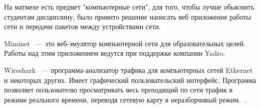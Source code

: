 
На матмехе есть предмет "компьютерные сети", для того, чтобы лучше обьяснить студентам дисциплину, 
было приянто решение написать веб приложение работы сети и передачи пакетов между устройствами сети.

Miminet~\cite{Miminet} --- это веб-эмулятор компьютерной сети для образовательных целей.
Работы над этим приложением ведутся при поддержке компании Yadro.

Wireshark~\cite{WireShark} — программа-анализатор трафика для компьютерных сетей Ethernet и некоторых других. 
Имеет графический пользовательский интерфейс.
Программа позволяет пользователю просматривать весь проходящий по сети трафик в режиме реального времени, 
переводя сетевую карту в неразборчивый режим.~\cite{wireShark_wiki}. 






